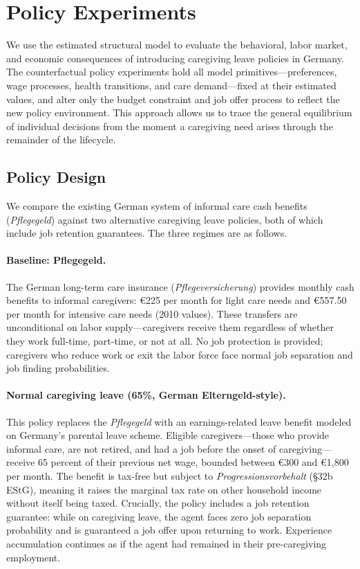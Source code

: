 \section{Policy Experiments}\label{sec:policy_experiments}

We use the estimated structural model to evaluate the behavioral, labor market, and economic consequences of introducing caregiving leave policies in Germany. The counterfactual policy experiments hold all model primitives---preferences, wage processes, health transitions, and care demand---fixed at their estimated values, and alter only the budget constraint and job offer process to reflect the new policy environment. This approach allows us to trace the general equilibrium of individual decisions from the moment a caregiving need arises through the remainder of the lifecycle.

\subsection{Policy Design}\label{subsec:policy_design}

We compare the existing German system of informal care cash benefits (\textit{Pflegegeld}) against two alternative caregiving leave policies, both of which include job retention guarantees. The three regimes are as follows.

\paragraph{Baseline: Pflegegeld.} The German long-term care insurance (\textit{Pflegeversicherung}) provides monthly cash benefits to informal caregivers: \euro{225} per month for light care needs and \euro{557.50} per month for intensive care needs (2010 values). These transfers are unconditional on labor supply---caregivers receive them regardless of whether they work full-time, part-time, or not at all. No job protection is provided; caregivers who reduce work or exit the labor force face normal job separation and job finding probabilities.

\paragraph{Normal caregiving leave (65\%, German Elterngeld-style).} This policy replaces the \textit{Pflegegeld} with an earnings-related leave benefit modeled on Germany's parental leave scheme. Eligible caregivers---those who provide informal care, are not retired, and had a job before the onset of caregiving---receive 65 percent of their previous net wage, bounded between \euro{300} and \euro{1,800} per month. The benefit is tax-free but subject to \textit{Progressionsvorbehalt} (\S 32b EStG), meaning it raises the marginal tax rate on other household income without itself being taxed. Crucially, the policy includes a job retention guarantee: while on caregiving leave, the agent faces zero job separation probability and is guaranteed a job offer upon returning to work. Experience accumulation continues as if the agent had remained in their pre-caregiving employment.

